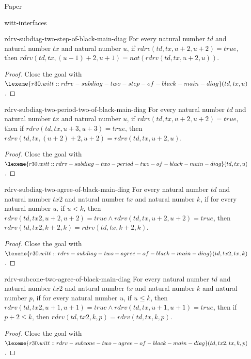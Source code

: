 \begin{lexlean}{Paper}
\begin{section}{witt-interfaces}
  \begin{theorem}{rdrv-subdiag-two-step-of-black-main-diag}
  For every natural number \(td\) and natural number \(tx\) and natural number \(u\), if \(rdrv(td, tx, u + 2, u + 2) = true\), then \(rdrv(td, tx, (u + 1) + 2, u + 1) = not(rdrv(td, tx, u + 2, u))\).
  \begin{proof}
  Close the goal with \(\lexeme{r30.witt::rdrv-subdiag-two-step-of-black-main-diag}(td, tx, u)\).
  \end{proof}
  \end{theorem}

  \begin{theorem}{rdrv-subdiag-two-period-two-of-black-main-diag}
  For every natural number \(td\) and natural number \(tx\) and natural number \(u\), if \(rdrv(td, tx, u + 2, u + 2) = true\), then if \(rdrv(td, tx, u + 3, u + 3) = true\), then \(rdrv(td, tx, (u + 2) + 2, u + 2) = rdrv(td, tx, u + 2, u)\).
  \begin{proof}
  Close the goal with \(\lexeme{r30.witt::rdrv-subdiag-two-period-two-of-black-main-diag}(td, tx, u)\).
  \end{proof}
  \end{theorem}

  \begin{theorem}{rdrv-subdiag-two-agree-of-black-main-diag}
  For every natural number \(td\) and natural number \(tx2\) and natural number \(tx\) and natural number \(k\), if for every natural number \(u\), if \(u < k\), then \(rdrv(td, tx2, u + 2, u + 2) = true ∧ rdrv(td, tx, u + 2, u + 2) = true\), then \(rdrv(td, tx2, k + 2, k) = rdrv(td, tx, k + 2, k)\).
  \begin{proof}
  Close the goal with \(\lexeme{r30.witt::rdrv-subdiag-two-agree-of-black-main-diag}(td, tx2, tx, k)\).
  \end{proof}
  \end{theorem}

  \begin{theorem}{rdrv-subcone-two-agree-of-black-main-diag}
  For every natural number \(td\) and natural number \(tx2\) and natural number \(tx\) and natural number \(k\) and natural number \(p\), if for every natural number \(u\), if \(u ≤ k\), then \(rdrv(td, tx2, u + 1, u + 1) = true ∧ rdrv(td, tx, u + 1, u + 1) = true\), then if \(p + 2 ≤ k\), then \(rdrv(td, tx2, k, p) = rdrv(td, tx, k, p)\).
  \begin{proof}
  Close the goal with \(\lexeme{r30.witt::rdrv-subcone-two-agree-of-black-main-diag}(td, tx2, tx, k, p)\).
  \end{proof}
  \end{theorem}


\end{section}
\end{lexlean}
